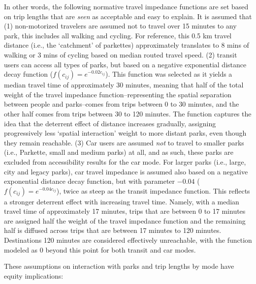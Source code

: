 \documentclass[
11pt, %
oneside, %
english, %
singlespacing, %
]{macthesis} %
\begin{document}
In other words, the following normative travel impedance functions are set based on trip lengths that are \emph{seen} as acceptable and easy to explain. It is assumed that (1) non-motorized travelers are assumed not to travel over 15 minutes to any park, this includes all walking and cycling. For reference, this 0.5 km travel distance (i.e., the `catchment' of parkettes) approximately translates to 8 mins of walking or 3 mins of cycling based on median routed travel speed. (2) transit users can access all types of parks, but based on a negative exponential distance decay function (\(f(c_{ij}) = e^{-0.02c_{ij}}\)). This function was selected as it yields a median travel time of approximately 30 minutes, meaning that half of the total weight of the travel impedance function--representing the spatial separation between people and parks--comes from trips between 0 to 30 minutes, and the other half comes from trips between 30 to 120 minutes. The function captures the idea that the deterrent effect of distance increases gradually, assigning progressively less `spatial interaction' weight to more distant parks, even though they remain reachable. (3) Car users are assumed \emph{not} to travel to smaller parks (i.e., Parkette, small and medium parks) at all, and as such, these parks are excluded from accessibility results for the car mode. For larger parks (i.e., large, city and legacy parks), car travel impedance is assumed also based on a negative exponential distance decay function, but with parameter \(-0.04\) (\(f(c_{ij}) = e^{-0.04c_{ij}}\)), twice as steep as the transit impedance function. This reflects a stronger deterrent effect with increasing travel time. Namely, with a median travel time of approximately 17 minutes, trips that are between 0 to 17 minutes are assigned half the weight of the travel impedance function and the remaining half is diffused across trips that are between 17 minutes to 120 minutes. Destinations 120 minutes are considered effectively unreachable, with the function modeled as 0 beyond this point for both transit and car modes.

These assumptions on interaction with parks and trip lengths by mode have equity implications:
\end{document}
